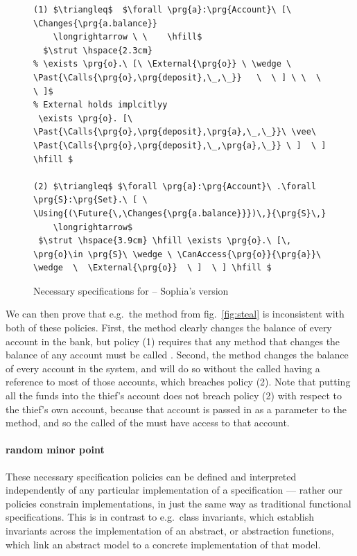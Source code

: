 \begin{figure}[tbp]
\begin{lstlisting}[escapeinside=`']
(1) $\triangleq$  $\forall \prg{a}:\prg{Account}\ [\ \Changes{\prg{a.balance}}  
    \longrightarrow \ \    \hfill$ 
  $\strut \hspace{2.3cm} 
% \exists \prg{o}.\ [\ \External{\prg{o}} \ \wedge \  \Past{\Calls{\prg{o},\prg{deposit},\_,\_}}   \  \ ] \ \  \ \ ]$
% External holds implcitlyy
 \exists \prg{o}. [\ \Past{\Calls{\prg{o},\prg{deposit},\prg{a},\_,\_}}\ \vee\  \Past{\Calls{\prg{o},\prg{deposit},\_,\prg{a},\_}} \ ]  \ ] \hfill $

(2) $\triangleq$ $\forall \prg{a}:\prg{Account}\ .\forall \prg{S}:\prg{Set}.\ [ \ \Using{(\Future{\,\Changes{\prg{a.balance}}})\,}{\prg{S}\,}
    \longrightarrow$ 
 $\strut \hspace{3.9cm} \hfill \exists \prg{o}.\ [\, \prg{o}\in \prg{S}\ \wedge \ \CanAccess{\prg{o}}{\prg{a}}\ \wedge  \  \External{\prg{o}}  \ ]  \ ] \hfill $
\end{lstlisting}

\caption{Necessary specifications for  -- Sophia's version}
\label{fig:necBank}
\end{figure}



We can then prove that e.g.\ the  method from
fig.~\ref{fig:steal} is inconsistent with both of these policies.
First, the  method clearly changes the balance of
every account in the bank, but policy (1) requires that any method
that changes the balance of any account must be called .
Second, the  method changes the balance of every account in
the system, and will do so without the called having a reference to
most of those accounts, which breaches policy (2).   Note
that  putting all the funds into the thief's account
does not breach policy (2) with respect to the thief's own account,
because that account is passed in as a parameter to the 
method, and so the called of the  must have access to that
account.


\paragraph{random minor point}

These necessary specification policies
can be defined and interpreted independently of any particular
implementation of a specification --- rather our policies constrain
implementations, in just the same way as traditional functional
specifications.  This is in contrast to e.g.\ class invariants, which
establish invariants across the implementation of an abstract, or
abstraction functions, which link an abstract model to a concrete
implementation of that model. 
